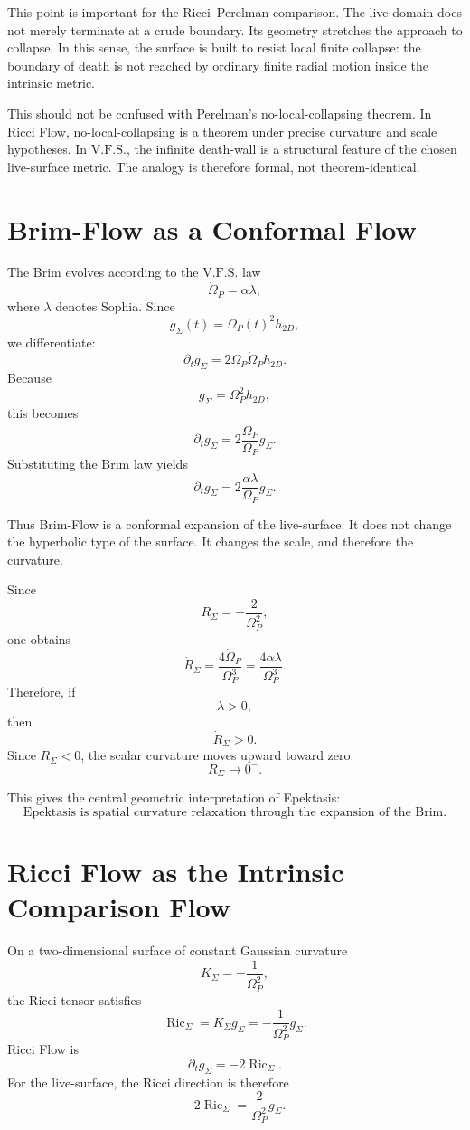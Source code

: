 \documentclass[11pt]{article}
\newcommand{\VFS}{\ensuremath{\mathrm{V.F.S.}}}
\newcommand{\Ric}{\operatorname{Ric}}
\begin{document}
This point is important for the Ricci--Perelman comparison. The live-domain does not merely terminate at a crude boundary. Its geometry stretches the approach to collapse. In this sense, the surface is built to resist local finite collapse: the boundary of death is not reached by ordinary finite radial motion inside the intrinsic metric.

This should not be confused with Perelman's no-local-collapsing theorem. In Ricci Flow, no-local-collapsing is a theorem under precise curvature and scale hypotheses. In \VFS{}, the infinite death-wall is a structural feature of the chosen live-surface metric. The analogy is therefore formal, not theorem-identical.

\section{Brim-Flow as a Conformal Flow}

The Brim evolves according to the \VFS{} law
\[
 \dot{\Omega}_P=\alpha\lambda,
\]
where \(\lambda\) denotes Sophia. Since
\[
 g_{\Sigma}(t)=\Omega_P(t)^2h_{2D},
\]
we differentiate:
\[
 \partial_t g_{\Sigma}
 =
 2\Omega_P\dot{\Omega}_P h_{2D}.
\]
Because
\[
 g_{\Sigma}=\Omega_P^2h_{2D},
\]
this becomes
\[
 \partial_t g_{\Sigma}
 =
 2\frac{\dot{\Omega}_P}{\Omega_P}g_{\Sigma}.
\]
Substituting the Brim law yields
\[
 \partial_t g_{\Sigma}
 =
 2\frac{\alpha\lambda}{\Omega_P}g_{\Sigma}.
\]

Thus Brim-Flow is a conformal expansion of the live-surface. It does not change the hyperbolic type of the surface. It changes the scale, and therefore the curvature.

Since
\[
 R_{\Sigma}=-\frac{2}{\Omega_P^2},
\]
one obtains
\[
 \dot R_{\Sigma}
 =
 \frac{4\dot\Omega_P}{\Omega_P^3}
 =
 \frac{4\alpha\lambda}{\Omega_P^3}.
\]
Therefore, if
\[
 \lambda>0,
\]
then
\[
 \dot R_{\Sigma}>0.
\]
Since \(R_{\Sigma}<0\), the scalar curvature moves upward toward zero:
\[
 R_{\Sigma}\to0^-.
\]

This gives the central geometric interpretation of Epektasis:
\[
\text{Epektasis is spatial curvature relaxation through the expansion of the Brim.}
\]

\section{Ricci Flow as the Intrinsic Comparison Flow}

On a two-dimensional surface of constant Gaussian curvature
\[
 K_{\Sigma}=-\frac{1}{\Omega_P^2},
\]
the Ricci tensor satisfies
\[
 \Ric_{\Sigma}=K_{\Sigma}g_{\Sigma}
 =
 -\frac{1}{\Omega_P^2}g_{\Sigma}.
\]
Ricci Flow is
\[
 \partial_t g_{\Sigma}=-2\Ric_{\Sigma}.
\]
For the live-surface, the Ricci direction is therefore
\[
 -2\Ric_{\Sigma}
 =
 \frac{2}{\Omega_P^2}g_{\Sigma}.
\]
\end{document}
